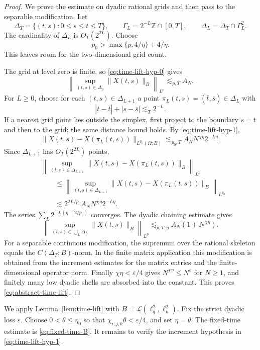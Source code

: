 \documentclass[11pt,reqno]{amsart}
\numberwithin{equation}{section}
\theoremstyle{plain}
\theoremstyle{definition}
\newcommand{\Z}{\mathbb Z}
\newcommand{\cL}{\mathcal L}
\newcommand{\eps}{\varepsilon}
\begin{document}
\begin{proof}
We prove the estimate on dyadic rational grids and then pass to the separable modification.  Let
\[
        \Delta_T=\{(t,s):0\le s\le t\le T\},
        \qquad
        \Gamma_L=2^{-L}\Z\cap[0,T],
        \qquad
        \Delta_L=\Delta_T\cap\Gamma_L^2 .
\]
The cardinality of \(\Delta_L\) is \(O_T(2^{2L})\).  Choose
\[
        p_0>\max\{p,4/\eta\}+4/\eta .
\]
This leaves room for the two-dimensional grid count.

The grid at level zero is finite, so \eqref{eq:time-lift-hyp-0} gives
\[
        \left\|\sup_{(t,s)\in\Delta_0}\|X(t,s)\|_B\right\|_{L^p}
        \lesssim_{p,T} A_N .
\]
For \(L\ge0\), choose for each \((t,s)\in\Delta_{L+1}\) a point \(\pi_L(t,s)=(\bar t,\bar s)\in\Delta_L\) with
\[
        |t-\bar t|+|s-\bar s|\lesssim_T 2^{-L}.
\]
If a nearest grid point lies outside the simplex, first project to the boundary \(s=t\) and then to the grid; the same distance bound holds.  By \eqref{eq:time-lift-hyp-1},
\[
        \|X(t,s)-X(\pi_L(t,s))\|_{L^{p_0}(\Omega;B)}
        \lesssim_{p_0,T} A_NN^{\chi\eta}2^{-L\eta}.
\]
Since \(\Delta_{L+1}\) has \(O_T(2^{2L})\) points,
\[
\begin{aligned}
        &\left\|\sup_{(t,s)\in\Delta_{L+1}}
        \|X(t,s)-X(\pi_L(t,s))\|_B\right\|_{L^p} \\
        &\qquad\le
        \left\|\sup_{(t,s)\in\Delta_{L+1}}
        \|X(t,s)-X(\pi_L(t,s))\|_B\right\|_{L^{p_0}} \\
        &\qquad\lesssim
        2^{2L/p_0} A_NN^{\chi\eta}2^{-L\eta}.
\end{aligned}
\]
The series \(\sum_L2^{-L(\eta-2/p_0)}\) converges.  The dyadic chaining estimate gives
\[
        \left\|\sup_{(t,s)\in\bigcup_L\Delta_L}\|X(t,s)\|_B\right\|_{L^p}
        \lesssim_{p,T,\eta} A_N(1+N^{\chi\eta}).
\]
For a separable continuous modification, the supremum over the rational skeleton equals the \(C(\Delta_T;B)\)-norm.  In the finite matrix application this modification is obtained from the increment estimates for the matrix entries and the finite-dimensional operator norm.  Finally \(\chi\eta<\eps/4\) gives \(N^{\chi\eta}\le N^\eps\) for \(N\ge1\), and finitely many low dyadic shells are absorbed into the constant.  This proves \eqref{eq:abstract-time-lift}.
\end{proof}

We apply Lemma~\ref{lem:time-lift} with \(B=\cL(\ell_q^2,\ell_n^2)\).  Fix the strict dyadic loss \(\eps\).  Choose \(0<\theta\le\eta_0\) so that \(\chi_{i;j,k}\theta<\eps/4\), and set \(\eta=\theta\).  The fixed-time estimate is \eqref{eq:fixed-time-B}.  It remains to verify the increment hypothesis in \eqref{eq:time-lift-hyp-1}.
\end{document}
